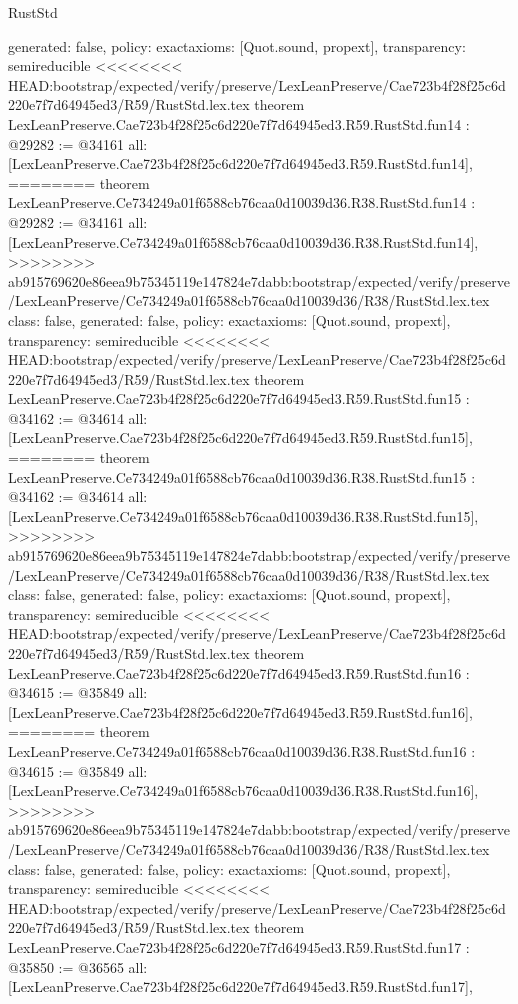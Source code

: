 \begin{lexlean}{RustStd}
\begin{coremodule}
{\begin{coremodule}
{{{{{{{{{{{{{{{{{  generated: false,
  policy: exact{axioms: [Quot.sound, propext]},
  transparency: semireducible
}
<<<<<<<< HEAD:bootstrap/expected/verify/preserve/LexLeanPreserve/Cae723b4f28f25c6d220e7f7d64945ed3/R59/RustStd.lex.tex
theorem LexLeanPreserve.Cae723b4f28f25c6d220e7f7d64945ed3.R59.RustStd.fun14 : @29282 := @34161 {
  all: [LexLeanPreserve.Cae723b4f28f25c6d220e7f7d64945ed3.R59.RustStd.fun14],
========
theorem LexLeanPreserve.Ce734249a01f6588cb76caa0d10039d36.R38.RustStd.fun14 : @29282 := @34161 {
  all: [LexLeanPreserve.Ce734249a01f6588cb76caa0d10039d36.R38.RustStd.fun14],
>>>>>>>> ab915769620e86eea9b75345119e147824e7dabb:bootstrap/expected/verify/preserve/LexLeanPreserve/Ce734249a01f6588cb76caa0d10039d36/R38/RustStd.lex.tex
  class: false,
  generated: false,
  policy: exact{axioms: [Quot.sound, propext]},
  transparency: semireducible
}
<<<<<<<< HEAD:bootstrap/expected/verify/preserve/LexLeanPreserve/Cae723b4f28f25c6d220e7f7d64945ed3/R59/RustStd.lex.tex
theorem LexLeanPreserve.Cae723b4f28f25c6d220e7f7d64945ed3.R59.RustStd.fun15 : @34162 := @34614 {
  all: [LexLeanPreserve.Cae723b4f28f25c6d220e7f7d64945ed3.R59.RustStd.fun15],
========
theorem LexLeanPreserve.Ce734249a01f6588cb76caa0d10039d36.R38.RustStd.fun15 : @34162 := @34614 {
  all: [LexLeanPreserve.Ce734249a01f6588cb76caa0d10039d36.R38.RustStd.fun15],
>>>>>>>> ab915769620e86eea9b75345119e147824e7dabb:bootstrap/expected/verify/preserve/LexLeanPreserve/Ce734249a01f6588cb76caa0d10039d36/R38/RustStd.lex.tex
  class: false,
  generated: false,
  policy: exact{axioms: [Quot.sound, propext]},
  transparency: semireducible
}
<<<<<<<< HEAD:bootstrap/expected/verify/preserve/LexLeanPreserve/Cae723b4f28f25c6d220e7f7d64945ed3/R59/RustStd.lex.tex
theorem LexLeanPreserve.Cae723b4f28f25c6d220e7f7d64945ed3.R59.RustStd.fun16 : @34615 := @35849 {
  all: [LexLeanPreserve.Cae723b4f28f25c6d220e7f7d64945ed3.R59.RustStd.fun16],
========
theorem LexLeanPreserve.Ce734249a01f6588cb76caa0d10039d36.R38.RustStd.fun16 : @34615 := @35849 {
  all: [LexLeanPreserve.Ce734249a01f6588cb76caa0d10039d36.R38.RustStd.fun16],
>>>>>>>> ab915769620e86eea9b75345119e147824e7dabb:bootstrap/expected/verify/preserve/LexLeanPreserve/Ce734249a01f6588cb76caa0d10039d36/R38/RustStd.lex.tex
  class: false,
  generated: false,
  policy: exact{axioms: [Quot.sound, propext]},
  transparency: semireducible
}
<<<<<<<< HEAD:bootstrap/expected/verify/preserve/LexLeanPreserve/Cae723b4f28f25c6d220e7f7d64945ed3/R59/RustStd.lex.tex
theorem LexLeanPreserve.Cae723b4f28f25c6d220e7f7d64945ed3.R59.RustStd.fun17 : @35850 := @36565 {
  all: [LexLeanPreserve.Cae723b4f28f25c6d220e7f7d64945ed3.R59.RustStd.fun17],
}}}}}}}}}}}}}}}}}}}}
\end{coremodule}}
\end{coremodule}
\end{lexlean}

